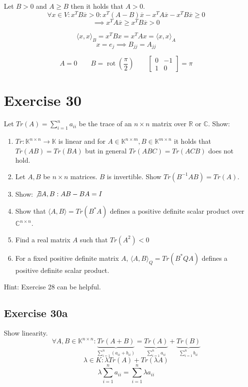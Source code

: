 \documentclass[a4paper]{article}
\theoremstyle{definition}
\begin{document}
Let $B > 0$ and $A \geq B$ then it holds that $A > 0$.
\[ \forall x \in V: x^T B \overline{x} > 0: x^T (A - B) \overline{x} - x^T A \overline{x}- x^T B \overline{x} \geq 0 \]
\[ \implies x^T A \overline{x} \geq x^T B \overline{x} > 0 \]


\[ \langle x, x\rangle_B = x^T B x = x^T Ax = \langle x,x\rangle_A \]
\[ x = e_j \implies B_{jj} = A_{jj} \]

\[ A = 0 \qquad B = \operatorname{rot}(\frac\pi2) \qquad \begin{bmatrix} 0 & -1 \\ 1 & 0 \end{bmatrix} = \pi \]

\section{Exercise 30}
\begin{ex}
  Let $Tr(A) = \sum_{i=1}^n a_{ii}$ be the trace of an $n\times n$ matrix over $\mathbb R$ or $\mathbb C$.
  Show:
  \begin{enumerate}
    \item $Tr: \mathbb K^{n\times n} \to \mathbb K$ is linear and for $A \in \mathbb K^{n\times m}, B \in \mathbb K^{m\times n}$ it holds that $Tr(AB) = Tr(BA)$ but in general $Tr(ABC) = Tr(ACB)$ does not hold.
    \item Let $A,B$ be $n\times n$ matrices. $B$ is invertible. Show $Tr(B^{-1}AB) = Tr(A)$.
    \item Show: $\not\exists A,B: AB - BA = I$
    \item Show that $\langle A,B\rangle = Tr(B^*A)$ defines a positive definite scalar product over $\mathbb C^{n\times n}$.
    \item Find a real matrix $A$ such that $Tr(A^2) < 0$
    \item For a fixed positive definite matrix $A$, $\langle A,B\rangle_Q = Tr(B^*QA)$ defines a positive definite scalar product.
  \end{enumerate}
  Hint: Exercise 28 can be helpful.
\end{ex}

\subsection{Exercise 30a}

Show linearity.
\[ \forall A,B \in \mathbb K^{n \times n}: \underbrace{Tr(A + B)}_{\sum_{i=1}^n (a_{ii} + b_{ii})} = \underbrace{Tr(A)}_{\sum_{i=1}^n a_{ii}} + \underbrace{Tr(B)}_{\sum_{i=1}^n b_{ii}} \]
\[ \lambda \in K: \lambda Tr(A) + Tr(\lambda A) \]
\[ \lambda \sum_{i=1}^n a_{ii} = \sum_{i=1}^n \lambda a_{ii} \]
\end{document}
